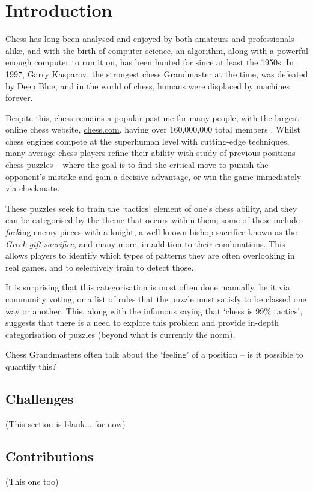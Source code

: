 \chapter{Introduction}

Chess has long been analysed and enjoyed by both amateurs and professionals
alike, and with the birth of computer science, an algorithm, along with a
powerful enough computer to run it on, has been hunted for since at least
the 1950s.\cite{shannon} In 1997, Garry Kasparov, the strongest chess
Grandmaster at the time, was defeated by Deep Blue,\cite{deepBlue} and
in the world of chess, humans were displaced by machines forever. 

Despite this, chess remains a popular pastime for many people, with the largest
online chess website, \url{chess.com}, having over 160,000,000 total members
\cite{chesscomMembers}. Whilst chess engines compete at the superhuman level
with cutting-edge techniques, many average chess players refine their ability
with study of previous positions -- chess puzzles -- where the goal is to find
the critical move to punish the opponent's mistake and gain a decisive
advantage, or win the game immediately via checkmate. 

These puzzles seek to train the `tactics' element of one's chess ability, and
they can be categorised by the theme that occurs within them; some of these
include \emph{fork}ing enemy pieces with a knight, a well-known bishop
sacrifice known as the \emph{Greek gift sacrifice}, and many more, in addition
to their combinations.\cite{chessPatterns} This allows players to identify
which types of patterns they are often overlooking in real games, and to
selectively train to detect those. 

It is surprising that this categorisation is most often done manually, be it
via community voting,\cite{lichessPuzzles} or a list of rules that the puzzle
must satisfy to be classed one way or another.\cite{lichessTagger} This, along
with the infamous saying that `chess is 99\% tactics', suggests that there is a
need to explore this problem and provide in-depth categorisation of puzzles
(beyond what is currently the norm).

Chess Grandmasters often talk about the `feeling' of a position -- is it
possible to quantify this?

\section{Challenges}

(This section is blank... for now)

\section{Contributions}

(This one too)

